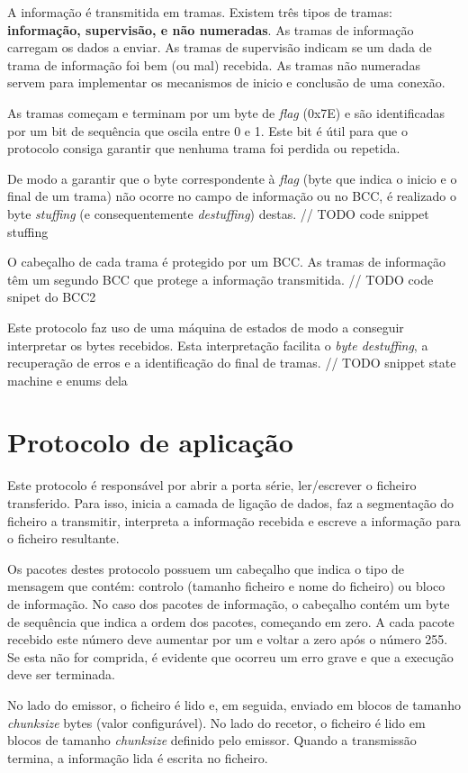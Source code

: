 \documentclass[11pt]{report}
\begin{document}
A informação é transmitida em tramas. Existem três tipos de tramas:
\textbf{informação, supervisão, e não numeradas}. As tramas de informação
carregam os dados a enviar. As tramas de supervisão indicam se um dada de
trama de informação foi bem (ou mal) recebida. As tramas não numeradas servem
para implementar os mecanismos de inicio e conclusão de uma conexão.

As tramas começam e terminam por um byte de \textit{flag} (0x7E) e são
identificadas por um bit de sequência que oscila entre 0 e 1. Este bit é útil
para que o protocolo consiga garantir que nenhuma trama foi perdida ou repetida.

De modo a garantir que o byte correspondente à \textit{flag} (byte que indica
o inicio e o final de um trama) não ocorre no campo de informação ou no BCC,
é realizado o byte \textit{stuffing} (e consequentemente \textit{destuffing})
destas.
// TODO code snippet stuffing

O cabeçalho de cada trama é protegido por um BCC. As tramas de informação têm um
segundo BCC que protege a informação transmitida.
// TODO code snipet do BCC2

Este protocolo faz uso de uma máquina de estados de modo a conseguir interpretar
os bytes recebidos. Esta interpretação facilita o \textit{byte destuffing}, a
recuperação de erros e a identificação do final de tramas.
// TODO snippet state machine e enums dela

\section{Protocolo de aplicação}

Este protocolo é responsável por abrir a porta série, ler/escrever o ficheiro
transferido. Para isso, inicia a camada de ligação de dados, faz a segmentação
do ficheiro a transmitir, interpreta a informação recebida e escreve a
informação para o ficheiro resultante.

Os pacotes destes protocolo possuem um cabeçalho que indica o tipo de mensagem
que contém: controlo (tamanho ficheiro e nome do ficheiro) ou bloco de
informação. No caso dos pacotes de informação, o cabeçalho contém um byte
de sequência que indica a ordem dos pacotes, começando em zero. A cada pacote
recebido este número deve aumentar por um e voltar a zero após o número 255.
Se esta não for comprida, é evidente que ocorreu um erro grave e que a execução
deve ser terminada.

No lado do emissor, o ficheiro é lido e, em seguida, enviado em blocos de
tamanho \textit{chunksize} bytes (valor configurável). No lado do recetor, o
ficheiro é lido em blocos de tamanho \textit{chunksize} definido pelo emissor.
Quando a transmissão termina, a informação lida é escrita no ficheiro.
\end{document}
